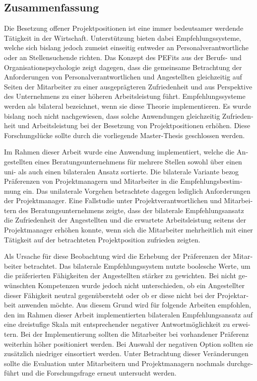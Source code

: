 \begin{otherlanguage}{ngerman}
\chapter*{Zusammenfassung}
Die Besetzung offener Projektpositionen ist eine immer bedeutsamer werdende Tätigkeit in der Wirtschaft. Unterstützung bieten dabei Empfehlungssysteme, welche sich bislang jedoch zumeist einseitig entweder an Personalverantwortliche oder an Stellensuchende richten. Das Konzept des \aclp{PEFit} aus der Berufs- und Organisationspsychologie zeigt dagegen, dass die gemeinsame Betrachtung der Anforderungen von Personalverantwortlichen und Angestellten gleichzeitig auf Seiten der Mitarbeiter zu einer ausgeprägteren Zufriedenheit und aus Perspektive des Unternehmens zu einer höheren Arbeitsleistung führt. Empfehlungssysteme werden als bilateral bezeichnet, wenn sie diese Theorie implementieren. Es wurde bislang noch nicht nachgewiesen, dass solche Anwendungen gleichzeitig Zufriedenheit und Arbeitsleistung bei der Besetzung von Projektpositionen erhöhen. Diese Forschungslücke sollte durch die vorliegende Master-Thesis geschlossen werden.

Im Rahmen dieser Arbeit wurde eine Anwendung implementiert, welche die Angestellten eines Beratungsunternehmens für mehrere Stellen sowohl über einen uni- als auch einen bilateralen Ansatz sortierte. Die bilaterale Variante bezog Präferenzen von Projektmanagern und Mitarbeiter in die Empfehlungsbestimmung ein. Das unilaterale Vorgehen betrachtete dagegen lediglich Anforderungen der Projektmanager. Eine Fallstudie unter Projektverantwortlichen und Mitarbeitern des Beratungsunternehmens zeigte, dass der bilaterale Empfehlungsansatz die Zufriedenheit der Angestellten und die erwartete Arbeitsleistung seitens der Projektmanager erhöhen konnte, wenn sich die Mitarbeiter mehrheitlich mit einer Tätigkeit auf der betrachteten Projektposition zufrieden zeigten.

Als Ursache für diese Beobachtung wird die Erhebung der Präferenzen der Mitarbeiter betrachtet. Das bilaterale Empfehlungssystem nutzte boolesche Werte, um die präferierten Fähigkeiten der Angestellten stärker zu gewichten. Bei nicht gewünschten Kompetenzen wurde jedoch nicht unterschieden, ob ein Angestellter dieser Fähigkeit neutral gegenübersteht oder ob er diese nicht bei der Projektarbeit anwenden möchte. Aus diesem Grund wird für folgende Arbeiten empfohlen, den im Rahmen dieser Arbeit implementierten bilateralen Empfehlungsansatz auf eine dreistufige Skala mit entsprechender negativer Antwortmöglichkeit zu erweitern. Bei der Implementierung sollten die Mitarbeiter bei vorhandener Präferenz weiterhin höher positioniert werden. Bei Auswahl der negativen Option sollten sie zusätzlich niedriger einsortiert werden. Unter Betrachtung dieser Veränderungen sollte die Evaluation unter Mitarbeitern und Projektmanagern nochmals durchgeführt und die Forschungsfrage erneut untersucht werden.
\end{otherlanguage}
